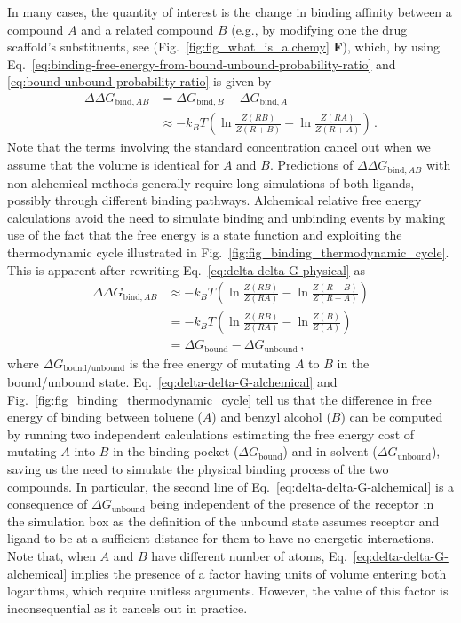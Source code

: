 \documentclass[9pt,bestpractices]{livecoms}
\begin{document}
In many cases, the quantity of interest is the change in binding affinity between a compound $A$ and a related compound $B$ (e.g., by modifying one the drug scaffold's substituents, see (Fig.~\ref{fig:fig_what_is_alchemy} \textbf{F}), which, by using Eq.~\ref{eq:binding-free-energy-from-bound-unbound-probability-ratio} and \ref{eq:bound-unbound-probability-ratio} is given by
\begin{equation}\label{eq:delta-delta-G-physical}
\begin{split}
    \Delta \Delta G_{\mathrm{bind}, AB} &= \Delta G_{\mathrm{bind}, B} - \Delta G_{\mathrm{bind}, A} \\
    &\approx -k_BT \left( \ln \frac{Z(RB)}{Z(R+B)} - \ln \frac{Z(RA)}{Z(R+A)} \right) \, .
\end{split}
\end{equation}
Note that the terms involving the standard concentration cancel out when we assume that the volume is identical for $A$ and $B$.
Predictions of $\Delta \Delta G_{\mathrm{bind}, AB}$ with non-alchemical methods generally require long simulations of both ligands, possibly through different binding pathways.
Alchemical relative free energy calculations avoid the need to simulate binding and unbinding events by making use of the fact that the free energy is a state function and exploiting the thermodynamic cycle illustrated in Fig.~\ref{fig:fig_binding_thermodynamic_cycle}.
This is apparent after rewriting Eq.~\ref{eq:delta-delta-G-physical} as
\begin{equation}\label{eq:delta-delta-G-alchemical}
\begin{split}
    \Delta \Delta G_{\mathrm{bind}, AB} &\approx -k_BT \left( \ln \frac{Z(RB)}{Z(RA)} - \ln \frac{Z(R+B)}{Z(R+A)} \right) \\
    &= -k_BT \left( \ln \frac{Z(RB)}{Z(RA)} - \ln \frac{Z(B)}{Z(A)} \right) \\
    &= \Delta G_{\mathrm{bound}} - \Delta G_{\mathrm{unbound}} \, ,
\end{split}
\end{equation}
where $\Delta G_{\mathrm{bound/unbound}}$ is the free energy of mutating $A$ to $B$ in the bound/unbound state.
Eq.~\ref{eq:delta-delta-G-alchemical} and Fig.~\ref{fig:fig_binding_thermodynamic_cycle} tell us that the difference in free energy of binding between toluene ($A$) and benzyl alcohol ($B$) can be computed by running two independent calculations estimating the free energy cost of mutating $A$ into $B$ in the binding pocket ($\Delta G_{\mathrm{bound}}$) and in solvent ($\Delta G_{\mathrm{unbound}}$), saving us the need to simulate the physical binding process of the two compounds.
In particular, the second line of Eq.~\ref{eq:delta-delta-G-alchemical} is a consequence of $\Delta G_{\mathrm{unbound}}$ being independent of the presence of the receptor in the simulation box as the definition of the unbound state assumes receptor and ligand to be at a sufficient distance for them to have no energetic interactions.
Note that, when $A$ and $B$ have different number of atoms, Eq.~\ref{eq:delta-delta-G-alchemical} implies the presence of a factor having units of volume entering both logarithms, which require unitless arguments.
However, the value of this factor is inconsequential as it cancels out in practice.
\end{document}
